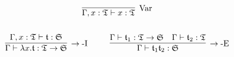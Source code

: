 \begin{gather*}
\infer[\mbox{Var}]{\Gamma, x : \T \vdash x : \T}{}
\\ \\ 
\infer[\rightarrow\mbox{-I}]{\Gamma \vdash \lambda x. \t : \T \rightarrow \mathfrak{S}}{\Gamma, x : \T \vdash \t : \mathfrak{S}}
~~~~ ~~~~
\infer[\rightarrow\mbox{-E}]{\Gamma \vdash \t_1\t_2 : \mathfrak{S}}{
    \Gamma \vdash \t_1 : \T \rightarrow \mathfrak{S}
    &
    \Gamma \vdash \t_2 : \T
}
\end{gather*}